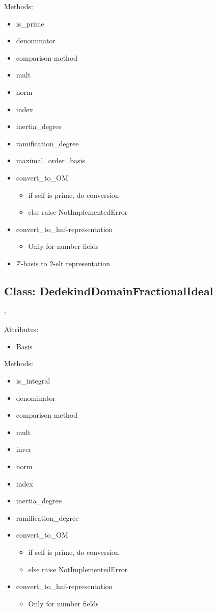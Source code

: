 \documentclass{amsart}
\theoremstyle{definition}
\begin{document}
	Methods:
	\begin{itemize}
		\item
		is\_prime
		\item
		denominator
		\item
		comparison method
		\item
		mult
		\item
		norm
		\item
		index
		\item
		inertia\_degree
		\item
		ramification\_degree
		\item
		maximal\_order\_basis
		\item
		convert\_to\_OM
			\begin{itemize}
				\item 
				if self is prime, do conversion
				\item
				else raise NotImplementedError
			\end{itemize}
		\item
		convert\_to\_hnf-representation
			\begin{itemize}
				\item 
				Only for number fields
			\end{itemize}
		\item
		$\mathbb{Z}$-basis to 2-elt representation
	\end{itemize}

	\subsection{Class: DedekindDomainFractionalIdeal}: \newline
	
	Attributes:
	\begin{itemize}
		\item 
		Basis
	\end{itemize}
	
	Methods:
	\begin{itemize}
		\item
		is\_integral
		\item
		denominator
		\item
		comparison method
		\item
		mult
		\item
		inver
		\item
		norm
		\item
		index
		\item
		inertia\_degree
		\item
		ramification\_degree
		\item
		convert\_to\_OM
		\begin{itemize}
			\item 
			if self is prime, do conversion
			\item
			else raise NotImplementedError
		\end{itemize}
		\item
		convert\_to\_hnf-representation
		\begin{itemize}
			\item 
			Only for number fields
		\end{itemize}
	\end{itemize}
\end{document}
